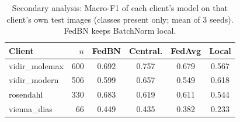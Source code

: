 \begin{table}[t]
\caption{Secondary analysis: Macro-F1 of each client's model on that client's own test images (classes present only; mean of 3 seeds). FedBN keeps BatchNorm local.}
\label{tab:fedbn}
\centering
\footnotesize
\begin{tabular}{lrcccc}
\hline
Client & $n$ & FedBN & Central. & FedAvg & Local \\
\hline
vidir\_molemax & 600 & 0.692 & 0.757 & 0.679 & 0.567 \\
vidir\_modern & 506 & 0.599 & 0.657 & 0.549 & 0.618 \\
rosendahl & 330 & 0.683 & 0.619 & 0.611 & 0.544 \\
vienna\_dias & 66 & 0.449 & 0.435 & 0.382 & 0.233 \\
\hline
\end{tabular}
\end{table}
